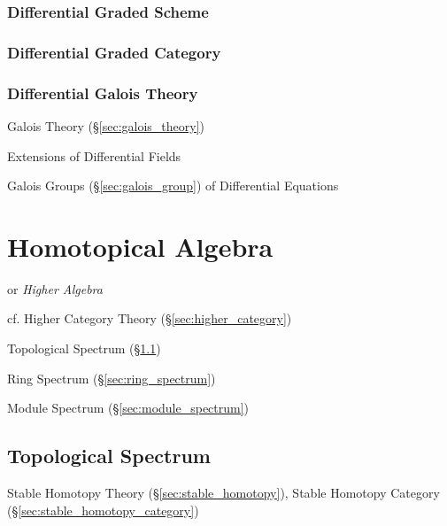 \subsubsection{Differential Graded Scheme}\label{sec:differential_graded_scheme}

\subsubsection{Differential Graded Category}
\label{sec:differential_graded_category}

\subsubsection{Differential Galois Theory}\label{sec:differential_galois}

Galois Theory (\S\ref{sec:galois_theory})

Extensions of Differential Fields

Galois Groups (\S\ref{sec:galois_group}) of Differential Equations



\section{Homotopical Algebra}\label{sec:homotopical_algebra}

or \emph{Higher Algebra}

cf. Higher Category Theory (\S\ref{sec:higher_category})

Topological Spectrum (\S\ref{sec:topological_spectrum})

Ring Spectrum (\S\ref{sec:ring_spectrum})

Module Spectrum (\S\ref{sec:module_spectrum})



\subsection{Topological Spectrum}\label{sec:topological_spectrum}


Stable Homotopy Theory (\S\ref{sec:stable_homotopy}), Stable Homotopy Category
(\S\ref{sec:stable_homotopy_category})

